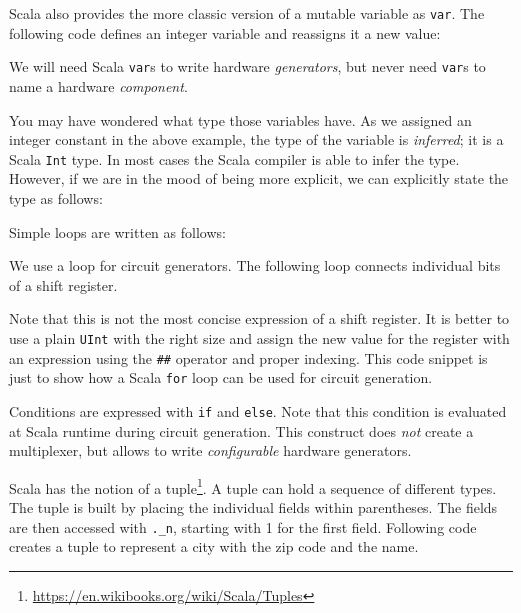 \documentclass[%
    10pt,
    headinclude, footexclude,
    openright, %
    notitlepage,
    cleardoubleempty,
    headsepline,
    pointlessnumbers,
    bibtotoc, idxtotoc,
    ]{scrbook}
\newcommand{\code}[1]{{\small{\texttt{#1}}}}
\newcommand{\myref}[2]{\href{#1}{#2}}
\renewcommand{\myref}[2]{{#2}{\footnote{\url{#1}}}}
\begin{document}
Scala also provides the more classic version of a mutable variable as \code{var}. The following code defines
an integer variable and reassigns it a new value:


\noindent We will need Scala \code{var}s to write hardware \emph{generators}, but never need
\code{var}s to name a hardware \emph{component}.

You may have wondered what type those variables have. As we assigned an integer constant
in the above example, the type of the variable is \emph{inferred}; it is a Scala \code{Int} type.
In most cases the Scala compiler is able to infer the type. However, if we are in the mood of
being more explicit, we can explicitly state the type as follows:


Simple loops are written as follows:


We use a loop for circuit generators. The following loop connects individual bits
of a shift register.


\noindent Note that this is not the most concise expression of a shift register.
It is better to use a plain \code{UInt} with the right size and assign the new value for the
register with an expression using the \code{\#\#} operator
and proper indexing. This code snippet is just to show how a Scala \code{for} loop can be used
for circuit generation.

Conditions are expressed with \code{if} and \code{else}. Note that this condition
is evaluated at Scala runtime during circuit generation. This construct does \emph{not}
create a multiplexer, but allows to write \emph{configurable} hardware generators.


Scala has the notion of a \myref{https://en.wikibooks.org/wiki/Scala/Tuples}{tuple}.
A tuple can hold a sequence of different types. The tuple is built by placing the individual fields
within parentheses. The fields are then accessed with \code{.\_n}, starting with 1 for the first field.
Following code creates a tuple to represent a city with the zip code and the name.


\end{document}
